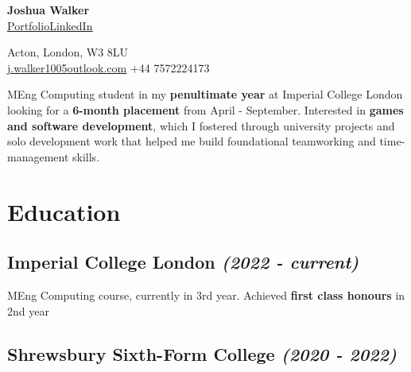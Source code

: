 \documentclass{article}
\makeatletter
\newcommand{\contact}[1]{\normalsize{#1}}
\newcommand{\contactdiv}{\hspace*{0.8em}}
\newcommand{\email}[2]{\href{mailto:#1@#2}{\underline{#1{\small\fontfamily{phv}\selectfont@}#2}}}
\newcommand{\linkedin}{\href{https://www.linkedin.com/in/joshua-walker-080714238/}{\underline{LinkedIn}}}
\newcommand{\portfolio}{\href{https://josh-ja-walker.github.io/portfolio/}{\underline{Portfolio}}}
\newcommand{\dates}[1]{\hfill\textit{(#1)}}
\newcommand{\tab}{\hspace{0.5cm}}
\makeatother
\begin{document}
\begin{multicols}{2}

    \begin{flushleft}
        {\LARGE\textbf{Joshua Walker}}\\
        \vspace{0.5em}
        \portfolio\contactdiv\linkedin
    \end{flushleft}
    
    \columnbreak
    
    \begin{flushright}
        \contact{Acton, London, W3 8LU}\\
        \vspace{0.5em}
        \contact{\email{j.walker1005}{outlook.com}}
        \contactdiv
        \contact{+44 7572224173}
    \end{flushright}
    
\end{multicols}

\vspace{1.25em}

{\noindent}MEng Computing student in my \textbf{penultimate year} at Imperial College London looking for a \textbf{6-month placement} from April - September. 
Interested in \textbf{games and software development}, which I fostered through university projects and solo development work 
that helped me build foundational teamworking and time-management skills. 

\vspace{0.15em}


\section*{Education}

\subsection*{\textbf{Imperial College London} \dates{2022 - current}}

{\tab}MEng Computing course, currently in 3rd year. Achieved \textbf{first class honours} in 2nd year


\subsection*{\textbf{Shrewsbury Sixth-Form College} \dates{2020 - 2022}}
\end{document}
